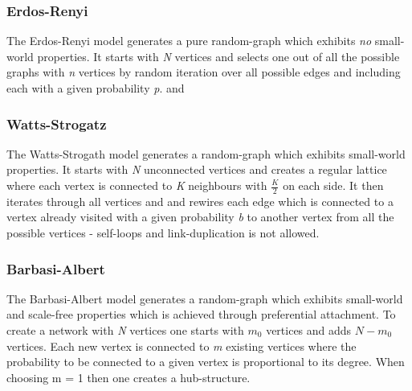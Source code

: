 \documentclass[../Bachelorarbeit.tex]{subfiles}
\begin{document}
\subsubsection{Erdos-Renyi}
The Erdos-Renyi model generates a pure random-graph which exhibits \textit{no} small-world properties. It starts with \textit{N} vertices and selects one out of all the possible graphs with \textit{n} vertices by random iteration over all possible edges and including each with a given probability \textit{p}. \cite{ErdosRenyi1959} and \cite{ErdosRenyi_EvolutionRandomGraphs}

\subsubsection{Watts-Strogatz}
The Watts-Strogath model generates a random-graph which exhibits small-world properties. It starts with \textit{N} unconnected vertices and creates a regular lattice where each vertex is connected to \textit{K} neighbours with $\frac{K}{2}$ on each side. It then iterates through all vertices and and rewires each edge which is connected to a vertex already visited with a given probability \textit{b} to another vertex from all the possible vertices - self-loops and link-duplication is not allowed. \cite{WattsStrogatz_DynamicsSmallWorld}

\subsubsection{Barbasi-Albert}
The Barbasi-Albert model generates a random-graph which exhibits small-world and scale-free properties which is achieved through preferential attachment. To create a network with \textit{N} vertices one starts with $m_0$ vertices and adds $N - m_0$ vertices. Each new vertex is connected to \textit{m} existing vertices where the probability to be connected to a given vertex is proportional to its degree. When choosing m = 1 then one creates a hub-structure. \cite{BarabasiAlbert_EmergenceScaling}
\end{document}
